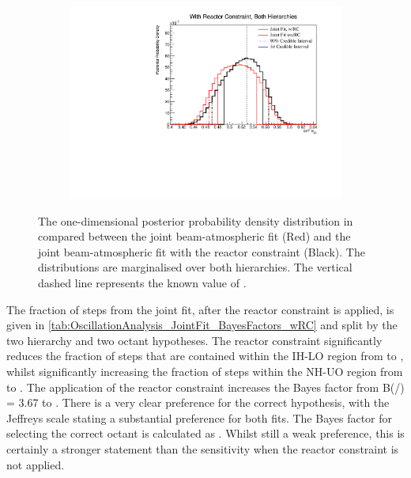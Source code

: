 \begin{figure}[h]
  \begin{subfigure}[t]{0.98\textwidth}
    \includegraphics[width=\textwidth, trim={0mm 0mm 0mm 0mm}, clip,page=1]{Figures/OA/JointFit_wRC_Comp/ContourComparison_1D_th23_BH_2_wRC_woRC_UnSmeared_CredibleInterval.pdf}
  \end{subfigure}
  \caption{The one-dimensional posterior probability density distribution in  compared between the joint beam-atmospheric fit (Red) and the joint beam-atmospheric fit with the reactor constraint (Black). The distributions are marginalised over both hierarchies. The vertical dashed line represents the known value of .}
  \label{fig:OscillationAnalysis_JointFit_wRC_Comp_TH23}
\end{figure}

The fraction of steps from the joint fit, after the reactor constraint is applied, is given in \autoref{tab:OscillationAnalysis_JointFit_BayesFactors_wRC} and split by the two hierarchy and two octant hypotheses. The reactor constraint significantly reduces the fraction of steps that are contained within the IH-LO region from  to , whilst significantly increasing the fraction of steps within the NH-UO region from  to . The application of the reactor constraint increases the Bayes factor from {B(/) = 3.67} to . There is a very clear preference for the correct hypothesis, with the Jeffreys scale stating a substantial preference for both fits. The Bayes factor for selecting the correct octant is calculated as . Whilst still a weak preference, this is certainly a stronger statement than the sensitivity when the reactor constraint is not applied.

